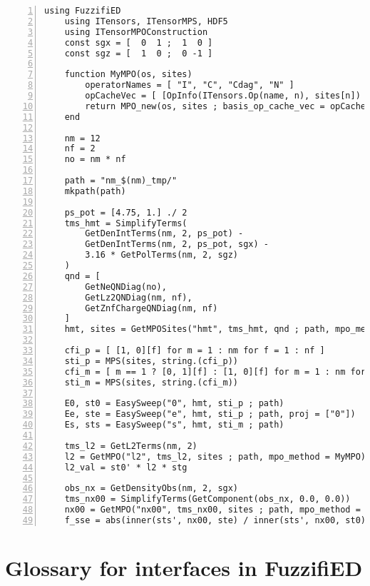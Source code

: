 \documentclass{timesjhep}
\begin{document}
\begin{lstlisting}[numbers=left]
    using FuzzifiED
    using ITensors, ITensorMPS, HDF5
    using ITensorMPOConstruction
    const sgx = [  0  1 ;  1  0 ]
    const sgz = [  1  0 ;  0 -1 ]

    function MyMPO(os, sites)
        operatorNames = [ "I", "C", "Cdag", "N" ]
        opCacheVec = [ [OpInfo(ITensors.Op(name, n), sites[n]) for name in operatorNames] for n in eachindex(sites)  ]
        return MPO_new(os, sites ; basis_op_cache_vec = opCacheVec)
    end

    nm = 12
    nf = 2
    no = nm * nf

    path = "nm_$(nm)_tmp/"
    mkpath(path)

    ps_pot = [4.75, 1.] ./ 2
    tms_hmt = SimplifyTerms(
        GetDenIntTerms(nm, 2, ps_pot) - 
        GetDenIntTerms(nm, 2, ps_pot, sgx) - 
        3.16 * GetPolTerms(nm, 2, sgz)
    )
    qnd = [ 
        GetNeQNDiag(no), 
        GetLz2QNDiag(nm, nf), 
        GetZnfChargeQNDiag(nm, nf) 
    ]
    hmt, sites = GetMPOSites("hmt", tms_hmt, qnd ; path, mpo_method = MyMPO)

    cfi_p = [ [1, 0][f] for m = 1 : nm for f = 1 : nf ]
    sti_p = MPS(sites, string.(cfi_p))
    cfi_m = [ m == 1 ? [0, 1][f] : [1, 0][f] for m = 1 : nm for f = 1 : nf ]
    sti_m = MPS(sites, string.(cfi_m))

    E0, st0 = EasySweep("0", hmt, sti_p ; path)
    Ee, ste = EasySweep("e", hmt, sti_p ; path, proj = ["0"])
    Es, sts = EasySweep("s", hmt, sti_m ; path)

    tms_l2 = GetL2Terms(nm, 2)
    l2 = GetMPO("l2", tms_l2, sites ; path, mpo_method = MyMPO)
    l2_val = st0' * l2 * stg

    obs_nx = GetDensityObs(nm, 2, sgx)
    tms_nx00 = SimplifyTerms(GetComponent(obs_nx, 0.0, 0.0))
    nx00 = GetMPO("nx00", tms_nx00, sites ; path, mpo_method = MyMPO)
    f_sse = abs(inner(sts', nx00, ste) / inner(sts', nx00, st0))
\end{lstlisting}

\section{Glossary for interfaces in FuzzifiED}
\label{app:glossary}
\end{document}
